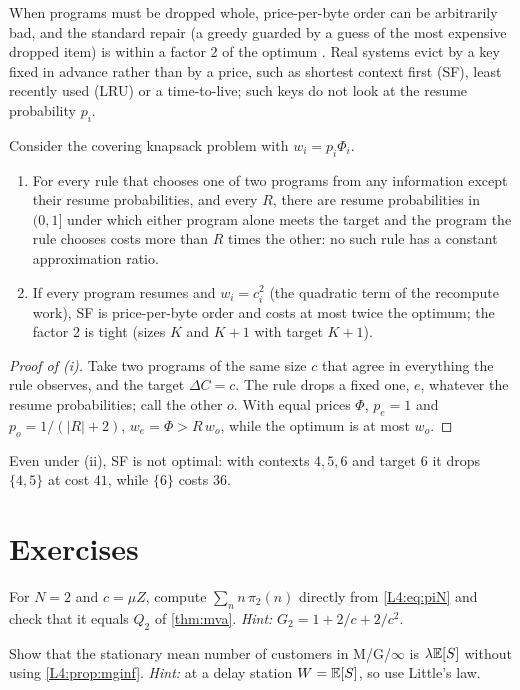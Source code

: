 When programs must be dropped whole, price-per-byte order can be arbitrarily bad,
and the standard repair (a greedy guarded by a guess of the most expensive dropped
item) is within a factor 2 of the optimum \cite{csirik1991}. Real systems evict by a
key fixed in advance rather than by a price, such as shortest context first (SF),
least recently used (LRU) or a time-to-live; such keys do not look at the resume
probability $p_i$.

\begin{proposition}\label{prop:blind}
Consider the covering knapsack problem with $w_i=p_i\Phi_i$.
\begin{enumerate}[label=(\roman*)]
\item For every rule that chooses one of two programs from any information except
  their resume probabilities, and every $R$, there are resume probabilities in
  $(0,1]$ under which either program alone meets the target and the program the rule
  chooses costs more than $R$ times the other: no such rule has a constant
  approximation ratio.
\item If every program resumes and $w_i=c_i^2$ (the quadratic term of the recompute
  work), SF is price-per-byte order and costs at most twice the optimum; the factor 2
  is tight (sizes $K$ and $K+1$ with target $K+1$).
\end{enumerate}
\end{proposition}

\begin{proof}[Proof of (i)]
Take two programs of the same size $c$ that agree in everything the rule observes, and
the target $\Delta C=c$. The rule drops a fixed one, $e$, whatever the resume
probabilities; call the other $o$. With equal prices $\Phi$, $p_e=1$ and
$p_o=1/(|R|+2)$, $w_e=\Phi>R\,w_o$, while the optimum is at most $w_o$.
\end{proof}

Even under (ii), SF is not optimal: with contexts $4,5,6$ and target $6$ it drops
$\{4,5\}$ at cost $41$, while $\{6\}$ costs $36$.

\section{Exercises}

\begin{exercise}
For $N=2$ and $c=\mu Z$, compute $\sum_nn\,\pi_2(n)$ directly from
\eqref{L4:eq:piN} and check that it equals $Q_2$ of \cref{thm:mva}.
\emph{Hint:} $G_2=1+2/c+2/c^2$.
\end{exercise}

\begin{exercise}
Show that the stationary mean number of customers in M/G/$\infty$ is $\lambda\mathbb{E}[S]$
without using \cref{L4:prop:mginf}.
\emph{Hint:} at a delay station $W=\mathbb{E}[S]$, so use Little's law.
\end{exercise}

